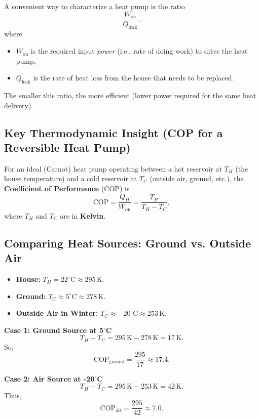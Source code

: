 \documentclass[12pt]{article}
\theoremstyle{definition} %
\theoremstyle{plain} %
\begin{document}
A convenient way to characterize a heat pump is the ratio
\[
\frac{W_{\text{on}}}{Q_{\text{leak}}},
\]
where 
\begin{itemize}
  \item $W_{\text{on}}$ is the required input \emph{power} (i.e., rate of doing work) to drive the heat pump,
  \item $Q_{\text{leak}}$ is the rate of heat loss from the house that needs to be replaced.
\end{itemize}
\noindent
The smaller this ratio, the more efficient (lower power required for the same heat delivery).

\subsection*{Key Thermodynamic Insight (COP for a Reversible Heat Pump)}

For an ideal (Carnot) heat pump operating between a hot reservoir at $T_H$ (the house temperature) and a cold reservoir at $T_C$ (outside air, ground, etc.), the \textbf{Coefficient of Performance} (COP) is
\[
\text{COP}
= \frac{Q_H}{W_{\text{on}}}
= \frac{T_H}{T_H - T_C},
\]
where $T_H$ and $T_C$ are in \textbf{Kelvin}.

\subsection*{Comparing Heat Sources: Ground vs. Outside Air}

\begin{itemize}
  \item \textbf{House:} $T_H = 22^\circ\mathrm{C} \approx 295\,\mathrm{K}.$
  \item \textbf{Ground:} $T_C \approx 5^\circ\mathrm{C} \approx 278\,\mathrm{K}.$
  \item \textbf{Outside Air in Winter:} $T_C \approx -20^\circ\mathrm{C} \approx 253\,\mathrm{K}.$
\end{itemize}

\vspace{1em}
\noindent
\textbf{Case 1: Ground Source at 5$^\circ$C}
\[
T_H - T_C
= 295\,\mathrm{K} - 278\,\mathrm{K}
= 17\,\mathrm{K}.
\]
So,
\[
\text{COP}_\text{ground}
= \frac{295}{17}
\approx 17.4.
\]

\noindent
\textbf{Case 2: Air Source at -20$^\circ$C}
\[
T_H - T_C
= 295\,\mathrm{K} - 253\,\mathrm{K}
= 42\,\mathrm{K}.
\]
Thus,
\[
\text{COP}_\text{air}
= \frac{295}{42}
\approx 7.0.
\]
\end{document}
